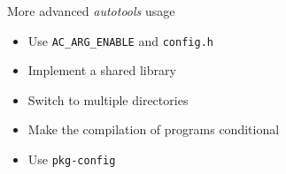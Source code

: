 \setuplabframe
{More advanced {\em autotools} usage}
{
  \begin{itemize}
  \item Use {\tt AC\_ARG\_ENABLE} and {\tt config.h}
  \item Implement a shared library
  \item Switch to multiple directories
  \item Make the compilation of programs conditional
  \item Use {\tt pkg-config}
  \end{itemize}
}
